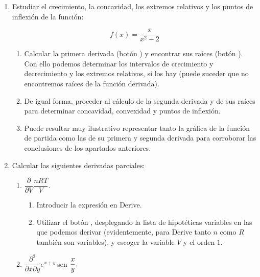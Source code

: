 \begin{enumerate}[leftmargin=*]
\item Estudiar el crecimiento, la concavidad, los extremos
relativos y los puntos de inflexión de la función:

\[
f(x)=\dfrac{x}{x^2-2}
\]


\begin{indicacion}
{
\begin{enumerate}
\item Calcular la primera derivada (botón ) y encontrar sus raíces (botón ). Con ello podemos determinar los intervalos de
crecimiento y decrecimiento y los extremos relativos, si los hay
(puede suceder que no encontremos raíces de la función derivada).

\item De igual forma, proceder al cálculo de la segunda derivada y
de sus raíces para determinar concavidad, convexidad y puntos de
inflexión.

\item Puede resultar muy ilustrativo representar tanto la gráfica
de la función de partida como las de su primera y segunda derivada
para corroborar las conclusiones de los apartados anteriores.

\end{enumerate}
}
\end{indicacion}

\item  Calcular las siguientes derivadas parciales:

\begin{enumerate}

\item  $\dfrac{\partial }{\partial V}\dfrac{nRT}{V}.$

\begin{indicacion}
{
\begin{enumerate}

\item Introducir la expresión en Derive.

\item Utilizar el botón , desplegando
la lista de hipotéticas variables en las que podemos derivar
(evidentemente, para Derive tanto $n$ como $R$ también son
variables), y escoger la variable $V$ y el orden $1$.

\end{enumerate}
}
\end{indicacion}

\item  $\dfrac{\partial ^{2}}{\partial x\partial y}e^{x+y}\ $sen$\ \dfrac{x}{%
y}.$



\end{enumerate}
\end{enumerate}
